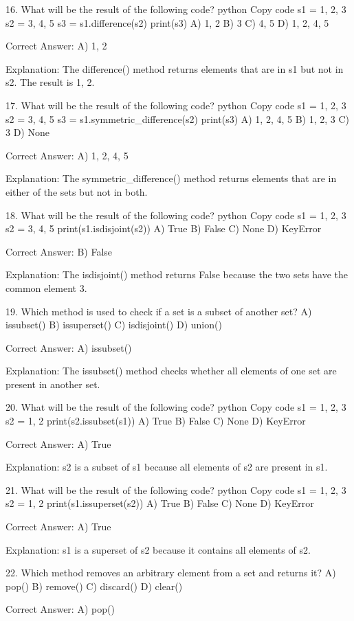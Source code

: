 16. What will be the result of the following code?
python
Copy code
s1 = {1, 2, 3}
s2 = {3, 4, 5}
s3 = s1.difference(s2)
print(s3)
A) {1, 2}
B) {3}
C) {4, 5}
D) {1, 2, 4, 5}

Correct Answer: A) {1, 2}

Explanation:
The difference() method returns elements that are in s1 but not in s2. The result is {1, 2}.

17. What will be the result of the following code?
python
Copy code
s1 = {1, 2, 3}
s2 = {3, 4, 5}
s3 = s1.symmetric_difference(s2)
print(s3)
A) {1, 2, 4, 5}
B) {1, 2, 3}
C) {3}
D) None

Correct Answer: A) {1, 2, 4, 5}

Explanation:
The symmetric_difference() method returns elements that are in either of the sets but not in both.

18. What will be the result of the following code?
python
Copy code
s1 = {1, 2, 3}
s2 = {3, 4, 5}
print(s1.isdisjoint(s2))
A) True
B) False
C) None
D) KeyError

Correct Answer: B) False

Explanation:
The isdisjoint() method returns False because the two sets have the common element 3.

19. Which method is used to check if a set is a subset of another set?
A) issubset()
B) issuperset()
C) isdisjoint()
D) union()

Correct Answer: A) issubset()

Explanation:
The issubset() method checks whether all elements of one set are present in another set.

20. What will be the result of the following code?
python
Copy code
s1 = {1, 2, 3}
s2 = {1, 2}
print(s2.issubset(s1))
A) True
B) False
C) None
D) KeyError

Correct Answer: A) True

Explanation:
s2 is a subset of s1 because all elements of s2 are present in s1.

21. What will be the result of the following code?
python
Copy code
s1 = {1, 2, 3}
s2 = {1, 2}
print(s1.issuperset(s2))
A) True
B) False
C) None
D) KeyError

Correct Answer: A) True

Explanation:
s1 is a superset of s2 because it contains all elements of s2.

22. Which method removes an arbitrary element from a set and returns it?
A) pop()
B) remove()
C) discard()
D) clear()

Correct Answer: A) pop()

